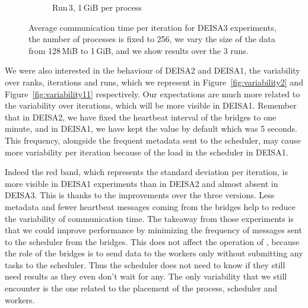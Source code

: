 \begin{figure}[h!]
\begin{subfigure}[b]{0.3\textwidth}
         \caption{Run\,3, 1\,GiB per process}
         \label{fig:E3_1}
     \end{subfigure}
        \caption{Average communication time per iteration for DEISA3 experiments, the number of processes is fixed to 256, we vary the size of the data from 128\,MiB to 1\,GiB, and we show results over the 3 runs.}
        \label{fig:variability}
\end{figure}


We were also interested in the behaviour of DEISA2 and DEISA1, the variability over ranks, iterations and runs, which we represent in Figure~\ref{fig:variability2} and Figure~\ref{fig:variability11} respectively.  
Our expectations are much more related to the variability over iterations, which will be more visible in DEISA1. 
Remember that in DEISA2, we have fixed the heartbeat interval of the bridges to one minute, and in DEISA1, we have kept the value by default which was 5 seconds. This frequency, alongside the frequent metadata sent to the scheduler, may cause more variability per iteration because of the load in the scheduler in DEISA1.  

Indeed the red band, which represents the standard deviation per iteration, is more visible in DEISA1 experiments than in DEISA2 and almost absent in DEISA3.  This is thanks to the improvements over the three versions.
Less metadata and fewer heartbeat messages coming from the bridges help to reduce the variability of communication time.
The takeaway from those experiments is that we could improve performance by minimizing the frequency of messages sent to the scheduler from the bridges. 
This does not affect the operation of \dask, because the role of the bridges is to send data to the workers only without submitting any tasks to the scheduler. Thus the scheduler does not need to know if they still need results as they even don't wait for any. 
The only variability that we still encounter is the one related to the placement of the process, scheduler and workers. 

